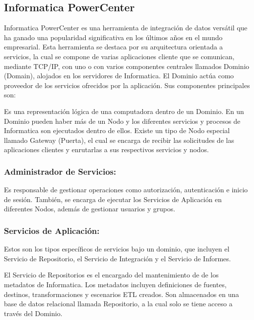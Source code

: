 \subsection{Informatica PowerCenter}

Informatica PowerCenter es una herramienta de integración de datos versátil que ha ganado una popularidad significativa 
en los últimos años en el mundo empresarial. Esta herramienta se destaca por su arquitectura orientada a servicios, 
la cual se compone de varias aplicaciones cliente que se comunican, mediante TCP/IP, con uno o con varios componentes 
centrales llamados Dominio (Domain), alojados en los servidores de Informatica. El Dominio actúa como proveedor de los 
servicios ofrecidos por la aplicación. Sus componentes principales son: 


Es una representaci\'on l\'ogica de una computadora dentro de un Dominio. En un Dominio pueden haber m\'as de un Nodo y 
los diferentes servicios y procesos de Informatica son ejecutados dentro de ellos. Existe un tipo de Nodo especial 
llamado Gateway (Puerta), el cual se encarga de recibir las solicitudes de las aplicaciones clientes y enrutarlas a sus 
respectivos servicios y nodos.

\subsubsection{Administrador de Servicios:} 

Es responsable de gestionar operaciones como autorización, autenticación e inicio de sesión. Tambi\'en, se encarga de 
ejecutar los Servicios de Aplicaci\'on en diferentes Nodos, además de gestionar usuarios y grupos.

\subsubsection{Servicios de Aplicaci\'on:}

Estos son los tipos específicos de servicios bajo un dominio, que incluyen el Servicio de Repositorio, el Servicio de 
Integración y el Servicio de Informes.

El Servicio de Repositorios es el encargado del mantenimiento de de los metadatos de Informatica. Los metadatos incluyen 
definiciones de fuentes, destinos, transformaciones y escenarios ETL creados. Son almacenados en una base de datos 
relacional llamada Repositorio, a la cual solo se tiene acceso a través del Dominio.

